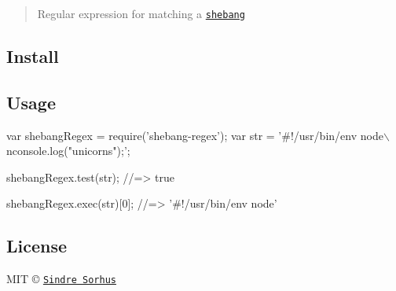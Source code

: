\begin{quote}
Regular expression for matching a \href{https://en.wikipedia.org/wiki/Shebang_(Unix)}{\tt shebang} \end{quote}


\subsection*{Install}




\subsection*{Usage}


\begin{DoxyCode}
var shebangRegex = require('shebang-regex');
var str = '#!/usr/bin/env node\(\backslash\)nconsole.log("unicorns");';

shebangRegex.test(str);
//=> true

shebangRegex.exec(str)[0];
//=> '#!/usr/bin/env node'
\end{DoxyCode}


\subsection*{License}

M\+IT © \href{http://sindresorhus.com}{\tt Sindre Sorhus} 